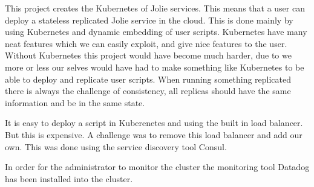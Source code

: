\documentclass[report.tex]{subfiles}
\begin{document}
This project creates the Kubernetes of Jolie services. This means that a user can deploy a stateless replicated Jolie service in the cloud. This is done mainly by using Kubernetes and dynamic embedding of user scripts. Kubernetes have many neat features which we can easily exploit, and give nice features to the user. Without Kubernetes this project would have become much harder, due to we more or less our selves would have had to make something like Kubernetes to be able to deploy and replicate user scripts. When running something replicated there is always the challenge of consistency, all replicas should have the same information and be in the same state.

It is easy to deploy a script in Kuberenetes and using the built in load balancer. But this is expensive. A challenge was to remove this load balancer and add our own. This was done using the service discovery tool Consul.

In order for the administrator to monitor the cluster the monitoring tool Datadog has been installed into the cluster.
\end{document}
